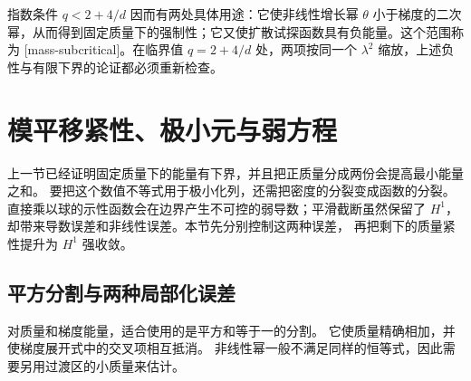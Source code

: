\ProseParagraphBreak
指数条件 \(q<2+4/d\) 因而有两处具体用途：它使非线性增长幂 \(\theta\) 小于梯度的二次幂，从而得到固定质量下的强制性；它又使扩散试探函数具有负能量。这个范围称为 [mass-subcritical]。在临界值 \(q=2+4/d\) 处，两项按同一个 \(\lambda^2\) 缩放，上述负性与有限下界的论证都必须重新检查。

\section{模平移紧性、极小元与弱方程}
\label{b2:sec:app-F-5}

上一节已经证明固定质量下的能量有下界，并且把正质量分成两份会提高最小能量之和。
要把这个数值不等式用于极小化列，还需把密度的分裂变成函数的分裂。
直接乘以球的示性函数会在边界产生不可控的弱导数；平滑截断虽然保留了 \(H^1\)，
却带来导数误差和非线性误差。本节先分别控制这两种误差，
再把剩下的质量紧性提升为 \(H^1\) 强收敛。

\subsection{平方分割与两种局部化误差}
\label{b2:subsec:F-ims-localization}

对质量和梯度能量，适合使用的是平方和等于一的分割。
它使质量精确相加，并使梯度展开式中的交叉项相互抵消。
非线性幂一般不满足同样的恒等式，因此需要另用过渡区的小质量来估计。

